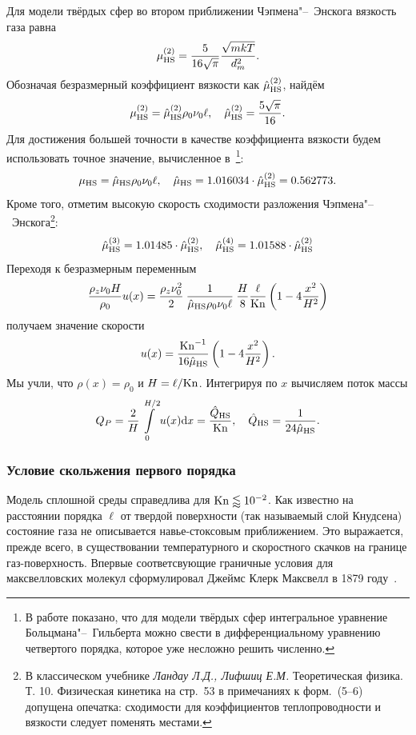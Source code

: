 Для модели твёрдых сфер во втором приближении Чэпмена"--~Энскога вязкость газа равна~\cite{Chapman1991}
\[ \mu_{\rm{HS}}^{(2)} = \frac{5}{16\sqrt\pi}\frac{\sqrt{mkT}}{d_m^2}. \]
Обозначая безразмерный коэффициент вязкости как \(\hat{\mu}_{\rm{HS}}^{(2)}\), найдём
\[ \mu_{\rm{HS}}^{(2)} = \hat{\mu}_{\rm{HS}}^{(2)}\rho_0\nu_0\ell, \quad \hat{\mu}_{\rm{HS}}^{(2)} = \frac{5\sqrt{\pi}}{16}. \]
Для достижения большей точности в качестве коэффициента вязкости будем использовать точное значение,
вычисленное в~\cite{Pekeris1957}\footnote{
	В работе показано, что для модели твёрдых сфер интегральное уравнение Больцмана"--~Гильберта
	можно свести в дифференциальному уравнению четвертого порядка, которое уже несложно решить численно.
}:
\begin{equation}\label{eq:eta_hs}
	\mu_{\rm{HS}} = \hat{\mu}_{\rm{HS}}\rho_0\nu_0\ell, \quad \hat{\mu}_{\rm{HS}} = 1.016034\cdot\hat{\mu}_{\rm{HS}}^{(2)} = 0.562773.
\end{equation}
Кроме того, отметим высокую скорость сходимости разложения Чэпмена"--~Энскога\footnote
{
	В классическом учебнике \textit{Ландау Л.Д., Лифшиц Е.М.} Теоретическая физика. Т. 10. Физическая кинетика
	на стр.~53 в примечаниях к форм.~(5--6) допущена опечатка:
	сходимости для коэффициентов теплопроводности и вязкости следует поменять местами.
}:
\[ \hat{\mu}_{\rm{HS}}^{(3)} = 1.01485\cdot\hat{\mu}_{\rm{HS}}^{(2)}, \quad \hat{\mu}_{\rm{HS}}^{(4)} = 1.01588\cdot\hat{\mu}_{\rm{HS}}^{(2)} \]
Переходя к безразмерным переменным
\[
	\frac{\rho_z \nu_0 H}{\rho_0}u(x) = \frac{\rho_z\nu_0^2}{2}\:
	\frac1{\hat{\mu}_{\rm{HS}}\rho_0\nu_0\ell}\:\frac{H}{8}\frac{\ell}{\mathrm{Kn}}
	\left(1-4\frac{x^2}{H^2}\right)
\]
получаем значение скорости
\[ u(x) = \frac{\mathrm{Kn}^{-1}}{16\hat{\mu}_{\rm{HS}}} \left(1-4\frac{x^2}{H^2}\right). \]
Мы учли, что \(\rho(x)=\rho_0\) и \(H=\ell/\mathrm{Kn}\).
Интегрируя по \(x\) вычисляем поток массы
\[ Q_P = \frac2{H}\int\limits_{0}^{H/2} u(x) \mathrm{d} x = \frac{\hat{Q}_{\rm{HS}}}{\mathrm{Kn}}, \quad \hat{Q}_{\rm{HS}} = \frac1{24\hat{\mu}_{\rm{HS}}}. \]

\subsubsection{Условие скольжения первого порядка}

Модель сплошной среды справедлива для \(\mathrm{Kn}\lessapprox10^{-2}\).
Как известно на расстоянии порядка \(\ell\) от твердой поверхности (так называемый слой Кнудсена)
состояние газа не описывается навье-стоксовым приближением.
Это выражается, прежде всего, в существовании температурного и скоростного скачков на границе газ-поверхность.
Впервые соответсвующие граничные условия для максвелловских молекул сформулировал
Джеймс Клерк Максвелл в 1879 году~\cite{Maxwell1879}.

